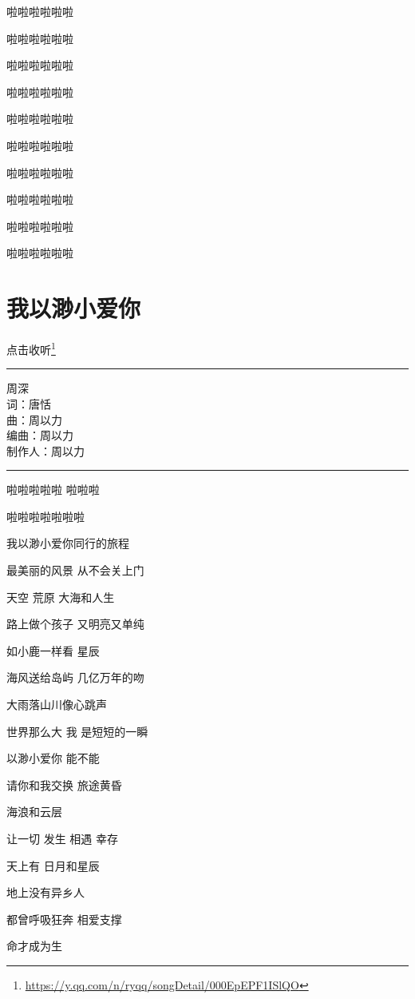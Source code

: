 \documentclass[]{ctexbook}
\renewcommand{\href}[2]{#2\footnote{\url{#1}}}
\begin{document}
啦啦啦啦啦啦

啦啦啦啦啦啦

啦啦啦啦啦啦

啦啦啦啦啦啦

啦啦啦啦啦啦

啦啦啦啦啦啦

啦啦啦啦啦啦

啦啦啦啦啦啦

啦啦啦啦啦啦

啦啦啦啦啦啦

\section*{我以渺小爱你}\label{loving-you-in-my-humble-way}


\href{https://y.qq.com/n/ryqq/songDetail/000EpEPF1ISlQO}{点击收听}

\begin{center}\rule{0.5\linewidth}{0.5pt}\end{center}

周深\\
词：唐恬\\
曲：周以力\\
编曲：周以力\\
制作人：周以力

\begin{center}\rule{0.5\linewidth}{0.5pt}\end{center}

啦啦啦啦啦 啦啦啦

啦啦啦啦啦啦啦

我以渺小爱你同行的旅程

最美丽的风景 从不会关上门

天空 荒原 大海和人生

路上做个孩子 又明亮又单纯

如小鹿一样看 星辰

海风送给岛屿 几亿万年的吻

大雨落山川像心跳声

世界那么大 我 是短短的一瞬

以渺小爱你 能不能

请你和我交换 旅途黄昏

海浪和云层

让一切 发生 相遇 幸存

天上有 日月和星辰

地上没有异乡人

都曾呼吸狂奔 相爱支撑

命才成为生
\end{document}
